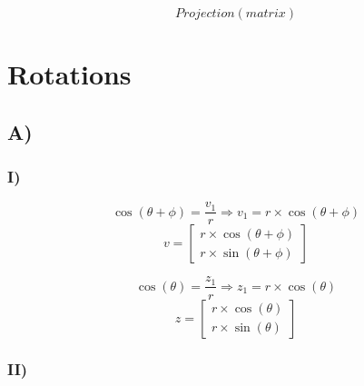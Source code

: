 \documentclass{article}
\begin{document}
$$Projection (matrix)$$

\section{Rotations}

\subsection{A)}

\subsubsection{I)}


$$	\cos(\theta + \phi) = \frac{v_1}{r} \Rightarrow v_1 = r \times \cos(\theta + \phi) $$
$$
	v= \begin{bmatrix}
		r \times \cos(\theta + \phi) \\
		r \times \sin(\theta + \phi)
	\end{bmatrix}
$$


$$	\cos(\theta) = \frac{z_1}{r} \Rightarrow z_1 = r \times \cos(\theta) $$
$$
	z= \begin{bmatrix}
		r \times \cos(\theta) \\
		r \times \sin(\theta)
	\end{bmatrix}
$$

\subsubsection{II)}
\end{document}
